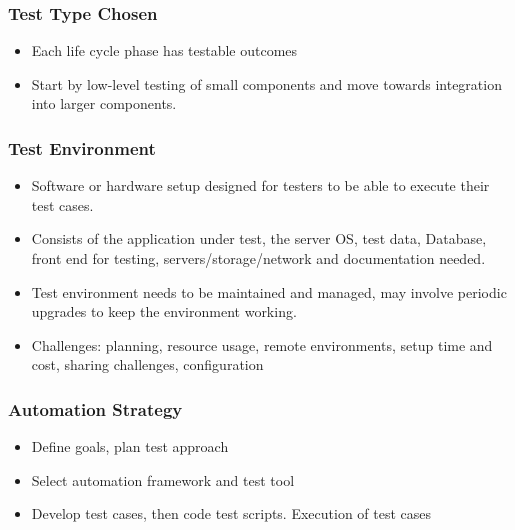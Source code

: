 \documentclass{article}
\begin{document}
\subsubsection{Test Type Chosen}
\begin{itemize}
    \item Each life cycle phase has testable outcomes 
    
    \item Start by low-level testing of small components and move towards integration into larger components. 
\end{itemize}

\subsubsection{Test Environment}
\begin{itemize}
    \item Software or hardware setup designed for testers to be able to execute their test cases. 
    
    \item Consists of the application under test, the server OS, test data, Database, front end for testing, servers/storage/network and documentation needed.
    
    \item Test environment needs to be maintained and managed, may involve periodic upgrades to keep the environment working.
    
    \item Challenges: planning, resource usage, remote environments, setup time and cost, sharing challenges, configuration
\end{itemize}

\subsubsection{Automation Strategy}
\begin{itemize}
    \item Define goals, plan test approach
    
    \item Select automation framework and test tool
    
    \item Develop test cases, then code test scripts. Execution of test cases
\end{itemize}
\end{document}
